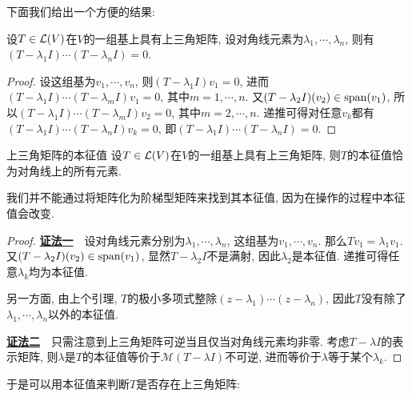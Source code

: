 下面我们给出一个方便的结果: 

\begin{lemma}{}
	设$T \in \mathcal{L} (V)$在$V$的一组基上具有上三角矩阵, 设对角线元素为$\lambda _1,\cdots ,\lambda _n$, 则有$(T-\lambda _1I) \cdots (T-\lambda _nI)=0$. 
\end{lemma}
\begin{proof}
	设这组基为$v_1,\cdots ,v_n$, 则$(T-\lambda _1I)v_1=0$, 进而$(T-\lambda _1I) \cdots (T-\lambda _mI)v_1=0$, 其中$m=1,\cdots ,n$. 又$(T-\lambda _2I)(v_2) \in \operatorname{span} (v_1)$, 所以$(T-\lambda _1I) \cdots (T-\lambda _mI)v_2=0$, 其中$m=2,\cdots ,n$. 递推可得对任意$v_k$都有$(T-\lambda _1I) \cdots (T-\lambda _nI)v_k=0$, 即$(T-\lambda _1I) \cdots (T-\lambda _nI)=0$. 
\end{proof}

\begin{proposition}{上三角矩阵的本征值}
	设$T \in \mathcal{L} (V)$在$V$的一组基上具有上三角矩阵, 则$T$的本征值恰为对角线上的所有元素. 
\end{proposition}
\begin{remark}
	我们并不能通过将矩阵化为阶梯型矩阵来找到其本征值, 因为在操作的过程中本征值会改变. 
\end{remark}
\begin{proof}
	\underline{\textbf{证法一}}~~设对角线元素分别为$\lambda _1,\cdots ,\lambda _n$, 这组基为$v_1,\cdots ,v_n$. 那么$Tv_1=\lambda _1v_1$. 又$(T-\lambda _2I)(v_2) \in \operatorname{span} (v_1)$, 显然$T-\lambda _2I$不是满射, 因此$\lambda _2$是本征值. 递推可得任意$\lambda _k$均为本征值. 
	
	另一方面, 由上个引理, $T$的极小多项式整除$(z-\lambda _1) \cdots (z-\lambda _n)$, 因此$T$没有除了$\lambda _1,\cdots ,\lambda _n$以外的本征值. 
	
	\underline{\textbf{证法二}}~~只需注意到上三角矩阵可逆当且仅当对角线元素均非零. 考虑$T-\lambda I$的表示矩阵, 则$\lambda$是$T$的本征值等价于$\mathcal{M} (T-\lambda I)$不可逆, 进而等价于$\lambda$等于某个$\lambda _k$. 
\end{proof}

于是可以用本征值来判断$T$是否存在上三角矩阵: 

